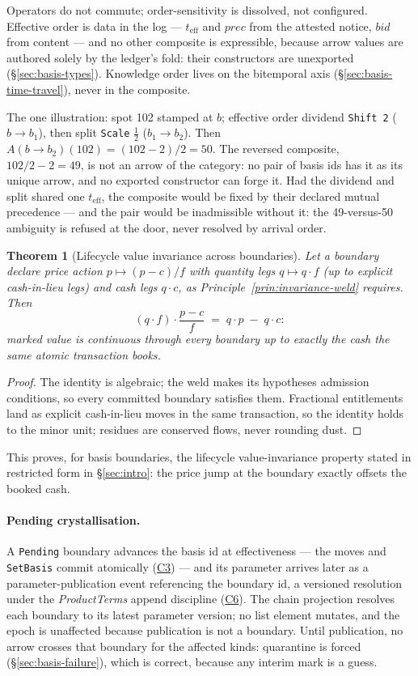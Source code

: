\documentclass[11pt,a4paper]{article}
\newtheorem{theorem}[definition]{Theorem}
\begin{document}
Operators do not commute; order-sensitivity is dissolved, not configured. Effective
order is data in the log --- $t_{\mathrm{eff}}$ and $\mathit{prec}$ from the attested
notice, $\mathit{bid}$ from content --- and no other composite is expressible, because
arrow values are authored solely by the ledger's fold: their constructors are unexported
(\S\ref{sec:basis-types}). Knowledge order lives on the bitemporal axis
(\S\ref{sec:basis-time-travel}), never in the composite.

The one illustration: spot 102 stamped at $b$; effective order dividend
\texttt{Shift 2} ($b\to b_1$), then split \texttt{Scale} $\tfrac12$ ($b_1\to b_2$).
Then $A(b\to b_2)(102)=(102-2)/2=50$. The reversed composite, $102/2-2=49$, is not an
arrow of the category: no pair of basis ids has it as its unique arrow, and no
exported constructor can forge it. Had the dividend and split shared one
$t_{\mathrm{eff}}$, the composite would be fixed by their declared mutual precedence ---
and the pair would be inadmissible without it: the 49-versus-50 ambiguity is refused at
the door, never resolved by arrival order.

\begin{theorem}[Lifecycle value invariance across boundaries]
\label{thm:basis-value-invariance}
Let a boundary declare price action $p\mapsto(p-c)/f$ with quantity legs
$q\mapsto q\cdot f$ (up to explicit cash-in-lieu legs) and cash legs $q\cdot c$, as
Principle~\ref{prin:invariance-weld} requires. Then
\[
(q\cdot f)\cdot\frac{p-c}{f} \;=\; q\cdot p \;-\; q\cdot c :
\]
marked value is continuous through every boundary up to exactly the cash the same atomic
transaction books.
\end{theorem}

\begin{proof}
The identity is algebraic; the weld makes its hypotheses admission conditions, so every
committed boundary satisfies them. Fractional entitlements land as explicit cash-in-lieu
moves in the same transaction, so the identity holds to the minor unit; residues are
conserved flows, never rounding dust.
\end{proof}

\noindent
This proves, for basis boundaries, the lifecycle value-invariance property stated in
restricted form in \S\ref{sec:intro}: the price jump at the boundary exactly offsets the
booked cash.

\paragraph{Pending crystallisation.} A \texttt{Pending} boundary advances the basis
id at effectiveness --- the moves and \texttt{SetBasis} commit atomically
(\hyperref[cond:C3]{C3}) --- and its parameter arrives later as a
parameter-publication event referencing the boundary id, a versioned resolution under
the \emph{ProductTerms} append discipline (\hyperref[cond:C6]{C6}). The chain projection
resolves each boundary to its latest parameter version; no list element mutates, and the
epoch is unaffected because publication is not a boundary. Until publication, no arrow
crosses that boundary for the affected kinds: quarantine is forced
(\S\ref{sec:basis-failure}), which is correct, because any interim mark is a guess.
\end{document}
